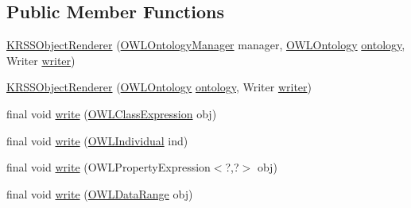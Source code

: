 \subsection*{Public Member Functions}
\begin{DoxyCompactItemize}
\item 
\hyperlink{classde_1_1uulm_1_1ecs_1_1ai_1_1owlapi_1_1krssrenderer_1_1_k_r_s_s_object_renderer_a2e1e5f2327ac3e7a6544cacb9a927c3c}{K\-R\-S\-S\-Object\-Renderer} (\hyperlink{interfaceorg_1_1semanticweb_1_1owlapi_1_1model_1_1_o_w_l_ontology_manager}{O\-W\-L\-Ontology\-Manager} manager, \hyperlink{interfaceorg_1_1semanticweb_1_1owlapi_1_1model_1_1_o_w_l_ontology}{O\-W\-L\-Ontology} \hyperlink{classde_1_1uulm_1_1ecs_1_1ai_1_1owlapi_1_1krssrenderer_1_1_k_r_s_s_object_renderer_a0eebb300c2e2da4f2ebb3eaf20cfaaa5}{ontology}, Writer \hyperlink{classde_1_1uulm_1_1ecs_1_1ai_1_1owlapi_1_1krssrenderer_1_1_k_r_s_s_object_renderer_ad94353da30589e50ec3a0bc88223c766}{writer})
\item 
\hyperlink{classde_1_1uulm_1_1ecs_1_1ai_1_1owlapi_1_1krssrenderer_1_1_k_r_s_s_object_renderer_a4c290f2ae8b29c340e98f0e1d4df4e4e}{K\-R\-S\-S\-Object\-Renderer} (\hyperlink{interfaceorg_1_1semanticweb_1_1owlapi_1_1model_1_1_o_w_l_ontology}{O\-W\-L\-Ontology} \hyperlink{classde_1_1uulm_1_1ecs_1_1ai_1_1owlapi_1_1krssrenderer_1_1_k_r_s_s_object_renderer_a0eebb300c2e2da4f2ebb3eaf20cfaaa5}{ontology}, Writer \hyperlink{classde_1_1uulm_1_1ecs_1_1ai_1_1owlapi_1_1krssrenderer_1_1_k_r_s_s_object_renderer_ad94353da30589e50ec3a0bc88223c766}{writer})
\item 
final void \hyperlink{classde_1_1uulm_1_1ecs_1_1ai_1_1owlapi_1_1krssrenderer_1_1_k_r_s_s_object_renderer_a864272697464ee1ddd76d89d9ae75a54}{write} (\hyperlink{interfaceorg_1_1semanticweb_1_1owlapi_1_1model_1_1_o_w_l_class_expression}{O\-W\-L\-Class\-Expression} obj)
\item 
final void \hyperlink{classde_1_1uulm_1_1ecs_1_1ai_1_1owlapi_1_1krssrenderer_1_1_k_r_s_s_object_renderer_abcb0061d25daa57d71b0a202093f5fce}{write} (\hyperlink{interfaceorg_1_1semanticweb_1_1owlapi_1_1model_1_1_o_w_l_individual}{O\-W\-L\-Individual} ind)
\item 
final void \hyperlink{classde_1_1uulm_1_1ecs_1_1ai_1_1owlapi_1_1krssrenderer_1_1_k_r_s_s_object_renderer_a3217761f0e6df30ad48b515aaa9e6998}{write} (O\-W\-L\-Property\-Expression$<$?,?$>$ obj)
\item 
final void \hyperlink{classde_1_1uulm_1_1ecs_1_1ai_1_1owlapi_1_1krssrenderer_1_1_k_r_s_s_object_renderer_a702feb472196f2aff104576a5245875c}{write} (\hyperlink{interfaceorg_1_1semanticweb_1_1owlapi_1_1model_1_1_o_w_l_data_range}{O\-W\-L\-Data\-Range} obj)

\end{DoxyCompactItemize}
